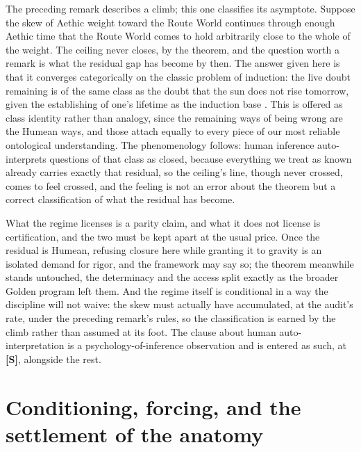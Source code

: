 \begin{remark}\label{sch:rem:inductionregime}
The preceding remark describes a climb; this one classifies its
asymptote. Suppose the skew of Aethic weight toward the Route World
continues through enough Aethic time that the Route World comes to
hold arbitrarily close to the whole of the weight. The ceiling never
closes, by the theorem, and the question worth a remark is what the
residual gap has become by then. The answer given here is that it
converges categorically on the classic problem of induction: the
live doubt remaining is of the same class as the doubt that the sun
does not rise tomorrow, given the establishing of one's lifetime as
the induction base \cite{Hume1748}. This is offered as class
identity rather than analogy, since the remaining ways of being
wrong are the Humean ways, and those attach equally to every piece
of our most reliable ontological understanding. The phenomenology
follows: human inference auto-interprets questions of that class as
closed, because everything we treat as known already carries exactly
that residual, so the ceiling's line, though never crossed, comes to
feel crossed, and the feeling is not an error about the theorem but
a correct classification of what the residual has become.

What the regime licenses is a parity claim, and what it does not
license is certification, and the two must be kept apart at the
usual price. Once the residual is Humean, refusing closure here
while granting it to gravity is an isolated demand for rigor, and
the framework may say so; the theorem meanwhile stands untouched,
the determinacy and the access split exactly as
the broader Golden program left them. And the regime itself is
conditional in a way the discipline will not waive: the skew must
actually have accumulated, at the audit's rate, under the preceding
remark's rules, so the classification is earned by the climb rather
than assumed at its foot. The clause about human auto-interpretation
is a psychology-of-inference observation and is entered as such, at
\textbf{[S]}, alongside the rest.
\end{remark}


\section{Conditioning, forcing, and the settlement of the anatomy}\label{sec:forcing}

